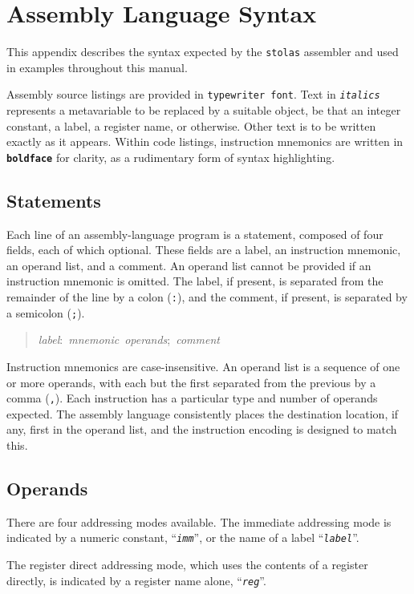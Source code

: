 \documentclass[12pt,english]{book}
\newcommand*{\asmstyle}{\noindent\ttfamily\selectfont\small}
\begin{document}

\chapter{Assembly Language Syntax}\label{ch:asm}
This appendix describes the syntax
expected by the \texttt{stolas} assembler
and used in examples throughout this manual.

Assembly source listings are provided in \texttt{typewriter font}.
Text in \texttt{\textit{italics}} represents a metavariable
to be replaced by a suitable object,
be that an integer constant, a label, a register name, or otherwise.
Other text is to be written exactly as it appears.
Within code listings,
instruction mnemonics are written in \texttt{\textbf{boldface}}
for clarity, as a rudimentary form of syntax highlighting.

\section{Statements}
Each line of an assembly-language program is a statement,
composed of four fields, each of which optional.
These fields are a label,
an instruction mnemonic,
an operand list,
and a comment.
An operand list cannot be provided
if an instruction mnemonic is omitted.
The label, if present, is separated from the remainder of the line
by a colon (\texttt{:}),
and the comment, if present, is separated by a semicolon (\texttt{;}).
\begin{quote}\asmstyle
\textit{label}:~\textit{mnemonic}~\textit{operands};~\textit{comment}
\end{quote}
Instruction mnemonics are case-insensitive.
An operand list is a sequence of one or more operands,
with each but the first separated from the previous
by a comma (\texttt{,}).
Each instruction has a particular type and number
of operands expected.
The assembly language consistently places
the destination location, if any, first in the operand list,
and the instruction encoding is designed to match this.

\section{Operands}
There are four addressing modes available.
The immediate addressing mode
is indicated by a numeric constant, ``\texttt{\textit{imm}}'',
or the name of a label ``\texttt{\textit{label}}''.

The register direct addressing mode,
which uses the contents of a register directly,
is indicated by a register name alone, ``\texttt{\textit{reg}}''.
\end{document}
